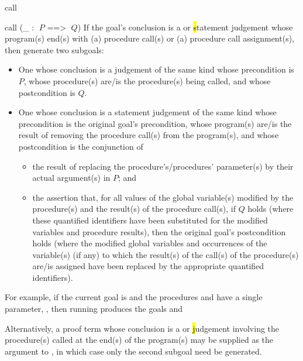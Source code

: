 \begin{tactic}{call}
  \begin{tsyntax}{call (_ : $\;P$ ==> $\;Q$)}
    If the goal's conclusion is a \prhl or \hl statement judgement
    whose program(s) end(s) with (a) procedure call(s) or (a) procedure
    call assignment(s), then generate two subgoals:
  \begin{itemize}
  \item One whose conclusion is a judgement of the same kind whose
    precondition is $P$, whose procedure(s) are/is the procedure(s)
    being called, and whose postcondition is $Q$.

  \item One whose conclusion is a statement judgement of the same
    kind whose precondition is the original goal's precondition,
    whose program(s) are/is the result of removing the procedure
    call(s) from the program(s), and whose postcondition is the
    conjunction of
    \begin{itemize}
    \item the result of replacing the procedure's/procedures'
      parameter(s) by their actual argument(s) in $P$; and

    \item the assertion that, for all values of the global variable(s)
      modified by the procedure(s) and the result(s) of the procedure
      call(s), if $Q$ holds (where these quantified identifiers have
      been substituted for the modified variables and procedure
      results), then the original goal's postcondition holds (where
      the modified global variables and occurrences of the variable(s)
      (if any) to which the result(s) of the call(s) of the
      procedure(s) are/is assigned have been replaced by the
      appropriate quantified identifiers).
    \end{itemize}
  \end{itemize}

  \medskip
  For example, if the current goal is
  and the procedures  and  have a single parameter,
  , then running
   produces the
  goals  and

  \bigskip
  Alternatively, a proof term whose conclusion is a \prhl or
  \hl judgement involving the procedure(s) called at the
  end(s) of the program(s) may be supplied as the argument to
  , in which case only the second subgoal need be
  generated.


\end{tsyntax}
\end{tactic}
